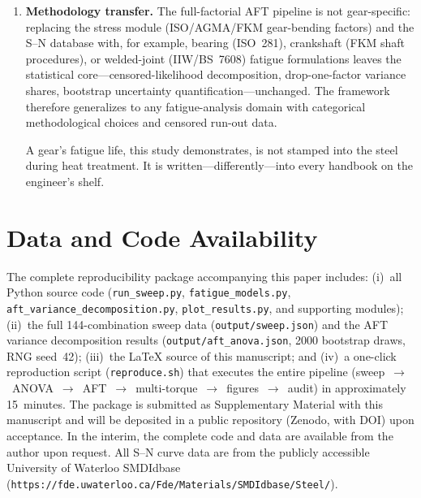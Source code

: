 \documentclass[twocolumn,12pt,a4paper]{article}
\begin{document}
\begin{enumerate}
        steels, and additional S--N curve batches (multiple heats of
        the same alloy) remains a priority for future work (Phase~2;
        \S\ref{sec:constraints}).
  \item \textbf{Methodology transfer.} The full-factorial AFT pipeline
        is not gear-specific: replacing the stress module
        (ISO/AGMA/FKM gear-bending factors) and the S--N database
        with, for example, bearing (ISO~281), crankshaft (FKM shaft
        procedures), or welded-joint (IIW/BS~7608) fatigue
        formulations leaves the statistical core---censored-likelihood
        decomposition, drop-one-factor variance shares, bootstrap
        uncertainty quantification---unchanged. The framework
        therefore generalizes to any fatigue-analysis domain with
        categorical methodological choices and censored run-out data.

\medskip
\noindent A gear's fatigue life, this study demonstrates, is not stamped
into the steel during heat treatment. It is written---differently---into
every handbook on the engineer's shelf.
\end{enumerate}

\section*{Data and Code Availability}

The complete reproducibility package accompanying this paper includes:
(i)~all Python source code (\texttt{run\_sweep.py},
\texttt{fatigue\_models.py}, \texttt{aft\_variance\_decomposition.py},
\texttt{plot\_results.py}, and supporting modules);
(ii)~the full 144-combination sweep data
(\texttt{output/sweep.json}) and the AFT variance decomposition
results (\texttt{output/aft\allowbreak\_anova\allowbreak.json},
2000 bootstrap draws, RNG seed~42);
(iii)~the LaTeX source of this manuscript; and
(iv)~a one-click reproduction script (\texttt{reproduce.sh}) that
executes the entire pipeline (sweep~$\rightarrow$~ANOVA~$\rightarrow$~AFT~$\rightarrow$~multi-torque~$\rightarrow$~figures~$\rightarrow$~audit)
in approximately 15~minutes.
The package is submitted as Supplementary Material with this
manuscript and will be deposited in a public repository (Zenodo,
with DOI) upon acceptance. In the interim, the complete code and
data are available from the author upon request. All S--N curve data are from the
publicly accessible University of Waterloo SMDIdbase
(\texttt{https://fde.uwaterloo.ca/\allowbreak Fde/Materials/\allowbreak SMDIdbase/Steel/}).
\end{document}
